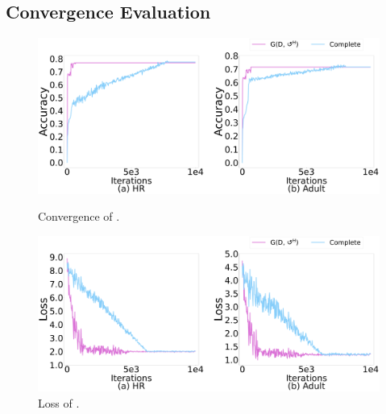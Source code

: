 \vspace{-0.5em}
\subsection{Convergence Evaluation}

\begin{figure}[t]   
	\centering
	\begin{minipage}[t]{0.49\textwidth}
		\centering
		\includegraphics[width=\columnwidth]{figs/G_a}
	    \vspace{-1.5em}
		\caption{Convergence of \ours.}
		\label{fig:converge_G}
	\end{minipage}
	\begin{minipage}[t]{0.49\textwidth}
		\centering
		\includegraphics[width=\columnwidth]{figs/G}
	    \vspace{-1.5em}
		\caption{Loss of \ours.}
		\label{fig:real_loss_G}
	\end{minipage}
	\vspace*{-1em}   
\end{figure}

